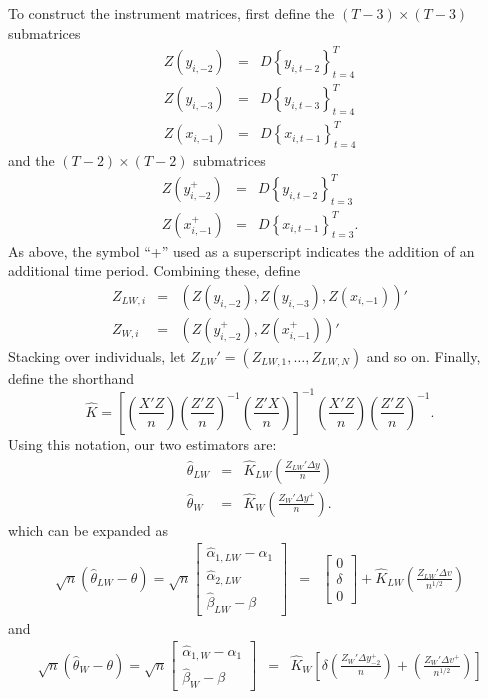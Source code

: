 To construct the instrument matrices, first define the $(T-3)\times(T-3)$ submatrices
\begin{eqnarray}
	Z(y_{i,-2}) &=& D\left\{ y_{i,t-2} \right\}_{t=4}^{T}\\
     Z(y_{i,-3}) &=& D\left\{ y_{i,t-3} \right\}_{t=4}^{T}\\
	Z(x_{i,-1}) &=& D\left\{ x_{i,t-1} \right\}_{t=4}^{T}
 \end{eqnarray}
and the $(T-2)\times(T-2)$ submatrices
\begin{eqnarray}
	Z(y_{i,-2}^+) &=&D\left\{ y_{i,t-2} \right\}_{t=3}^{T}\\
		Z(x_{i,-1}^+) &=& D\left\{x_{i,t-1}  \right\}_{t=3}^{T}.
 \end{eqnarray}
As above, the symbol ``+'' used as a superscript indicates the addition of an additional time period. 
Combining these, define 
	\begin{eqnarray}
	Z_{LW,i} &=&  \left(Z(y_{i,-2}), Z(y_{i,-3}), Z(x_{i,-1}) \right)'\\
	Z_{W,i} &=&  \left(Z(y_{i,-2}^+),  Z(x_{i,-1}^+) \right)'
	\end{eqnarray}
Stacking over individuals, let $Z_{LW}' = \left(Z_{LW,1}, \hdots,  Z_{LW,N}\right)$ and so on. 
Finally, define the shorthand
\begin{equation}
\label{eq:KSRvsLR}
	\widehat{K} = \left[\left(\frac{X'Z}{n}\right)\left(\frac{Z'Z}{n}\right)^{-1}\left(\frac{Z'X}{n}\right)\right]^{-1}\left(\frac{X'Z}{n}\right)\left(\frac{Z'Z}{n}\right)^{-1}.
\end{equation}
Using this notation, our two estimators are:
\begin{eqnarray}
	\widehat{\theta}_{LW} &=& \widehat{K}_{LW}\left(\frac{Z_{LW}'\Delta y}{n}\right)\\
	\widehat{\theta}_{W} &=&  \widehat{K}_W\left(\frac{Z_{W}'\Delta y^+}{n}\right).
\end{eqnarray}
which can be expanded as 
	\begin{eqnarray}
	\label{eq:distexpandLSSRvsLR}
						\sqrt{n}(\widehat{\theta}_{LW} - \theta) = \sqrt{n} \left[\begin{array}{l} \widehat{\alpha}_{1,LW}-\alpha_1\\ 
\widehat{\alpha}_{2,LW}\\						
						\widehat{\beta}_{LW} - \beta
						\end{array}\right]   &=& \left[\begin{array}{c}0 \\ \delta\\ 0\end{array}\right]+ \widehat{K}_{LW}\left(\frac{Z_{LW}'\Delta v}{n^{1/2}}\right)
\end{eqnarray}
and
\begin{eqnarray}
		\sqrt{n}\left(\widehat{\theta}_W-\theta \right) =\sqrt{n} \left[\begin{array}{l} \widehat{\alpha}_{1,W}-\alpha_1\\ 
						\widehat{\beta}_{W} - \beta
						\end{array}\right]  &=&  \widehat{K}_W\left[\delta\left( \frac{Z_{W}'\Delta y_{-2}^+}{n}\right) + \left( \frac{Z_{W}'\Delta v^+}{n^{1/2}}\right)\right]
	\end{eqnarray}


